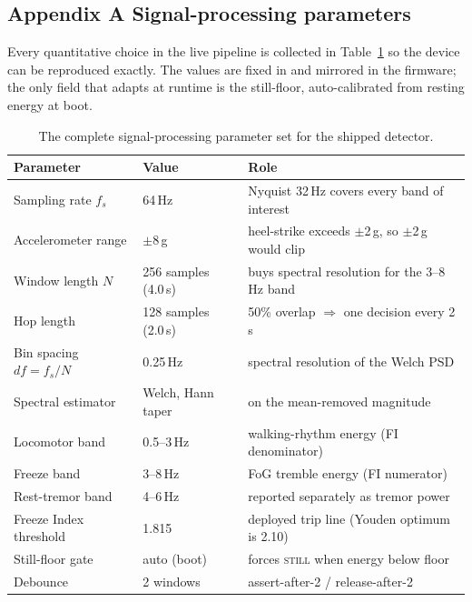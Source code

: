 \subsection*{Appendix A \quad Signal-processing parameters}

Every quantitative choice in the live pipeline is collected in
Table~\ref{tab:params} so the device can be reproduced exactly. The values are fixed in
 and mirrored in the firmware; the only field that adapts at runtime is
the still-floor, auto-calibrated from resting energy at boot.

\begin{table}[H]
\centering
\caption{The complete signal-processing parameter set for the shipped detector.}
\label{tab:params}
\small
\begin{tabular}{@{}llp{6.6cm}@{}}
\toprule
\textbf{Parameter} & \textbf{Value} & \textbf{Role} \\
\midrule
Sampling rate $f_s$        & 64\,Hz             & Nyquist 32\,Hz covers every band of interest \\
Accelerometer range        & $\pm$8\,g          & heel-strike exceeds $\pm$2\,g, so $\pm$2\,g would clip \\
Window length $N$          & 256 samples (4.0\,s) & buys spectral resolution for the 3--8\,Hz band \\
Hop length                 & 128 samples (2.0\,s) & 50\% overlap $\Rightarrow$ one decision every 2\,s \\
Bin spacing $df=f_s/N$     & 0.25\,Hz           & spectral resolution of the Welch PSD \\
Spectral estimator         & Welch, Hann taper  & on the mean-removed magnitude \\
Locomotor band             & 0.5--3\,Hz         & walking-rhythm energy (FI denominator) \\
Freeze band                & 3--8\,Hz           & FoG tremble energy (FI numerator) \\
Rest-tremor band           & 4--6\,Hz           & reported separately as tremor power \\
Freeze Index threshold     & 1.815              & deployed trip line (Youden optimum is 2.10) \\
Still-floor gate           & auto (boot)        & forces \textsc{still} when energy below floor \\
Debounce                   & 2 windows          & assert-after-2 / release-after-2 \\
\bottomrule
\end{tabular}
\end{table}

